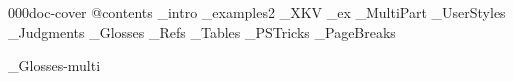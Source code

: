 





\get 000doc-cover
\get @contents
_intro
_examples2
_XKV
_ex
_MultiPart
_UserStyles
_Judgments
_Glosses
_Refs
_Tables
_PSTricks
_PageBreaks



\bye
{}_Glosses-multi

